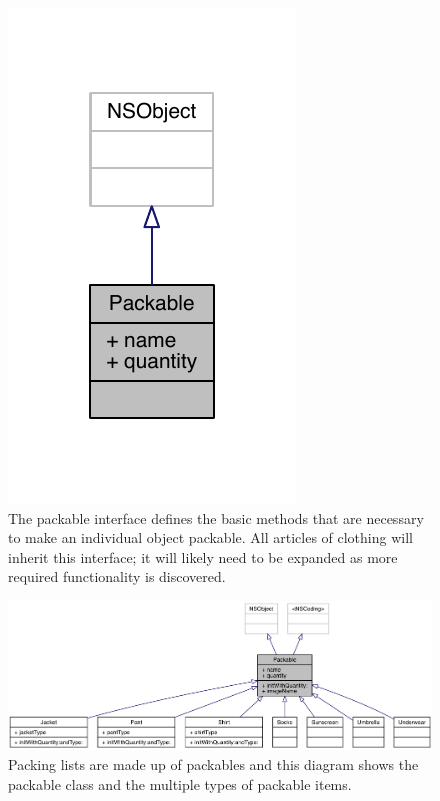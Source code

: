 \documentclass[11pt]{article}
\begin{document}
    \begin{figure}
        \centering
        \includegraphics[scale=0.75]{img/packable.pdf}
        \caption{The packable interface defines the basic methods that are necessary to make an individual object packable. All articles of clothing will inherit this interface; it will likely need to be expanded as more required functionality is discovered.}
        \label{fig:packable}
    \end{figure}

    \begin{figure}
        \centering
        \includegraphics[width=\textwidth]{img/interface_packable.png}
        \caption{Packing lists are made up of packables and this diagram shows the packable class and the multiple types of packable items.}
        \label{fig:packable-interface}
    \end{figure}
\end{document}
